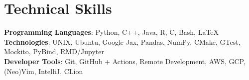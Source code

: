 \documentclass[letterpaper,11pt]{article}
\begin{document}
%
\section{Technical Skills}
 \begin{itemize}[leftmargin=0.15in, label={}]
    \small{\item{
     \textbf{Programming Languages}{: Python, C++, Java, R, C, Bash, \LaTeX} \\
     \textbf{Technologies}{: UNIX, Ubuntu, Google Jax, Pandas, NumPy, CMake, GTest, Mockito, PyBind, RMD/Jupyter } \\
          \textbf{Developer Tools}{: Git, GitHub + Actions, Remote Development, AWS, GCP, (Neo)Vim, IntelliJ, CLion} \\
    }}
 \end{itemize}


\end{document}
